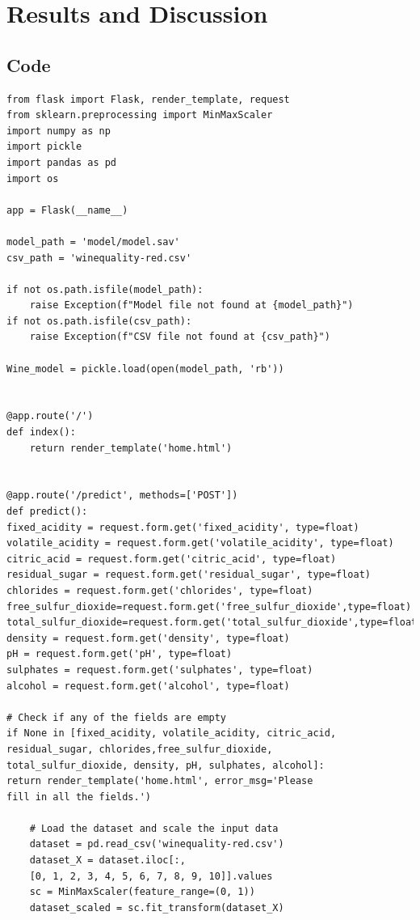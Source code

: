 \documentclass[a4paper, 12pt]{report}
\begin{document}
\chapter{Results and Discussion}
\section{Code}
\begin{lstlisting}
from flask import Flask, render_template, request
from sklearn.preprocessing import MinMaxScaler
import numpy as np
import pickle
import pandas as pd
import os

app = Flask(__name__)

model_path = 'model/model.sav'
csv_path = 'winequality-red.csv'

if not os.path.isfile(model_path):
    raise Exception(f"Model file not found at {model_path}")
if not os.path.isfile(csv_path):
    raise Exception(f"CSV file not found at {csv_path}")

Wine_model = pickle.load(open(model_path, 'rb'))


@app.route('/')
def index():
    return render_template('home.html')


@app.route('/predict', methods=['POST'])
def predict():
fixed_acidity = request.form.get('fixed_acidity', type=float)
volatile_acidity = request.form.get('volatile_acidity', type=float)
citric_acid = request.form.get('citric_acid', type=float)
residual_sugar = request.form.get('residual_sugar', type=float)
chlorides = request.form.get('chlorides', type=float)
free_sulfur_dioxide=request.form.get('free_sulfur_dioxide',type=float)
total_sulfur_dioxide=request.form.get('total_sulfur_dioxide',type=float)
density = request.form.get('density', type=float)
pH = request.form.get('pH', type=float)
sulphates = request.form.get('sulphates', type=float)
alcohol = request.form.get('alcohol', type=float)

# Check if any of the fields are empty
if None in [fixed_acidity, volatile_acidity, citric_acid, 
residual_sugar, chlorides,free_sulfur_dioxide, 
total_sulfur_dioxide, density, pH, sulphates, alcohol]:
return render_template('home.html', error_msg='Please 
fill in all the fields.')

    # Load the dataset and scale the input data
    dataset = pd.read_csv('winequality-red.csv')
    dataset_X = dataset.iloc[:, 
    [0, 1, 2, 3, 4, 5, 6, 7, 8, 9, 10]].values
    sc = MinMaxScaler(feature_range=(0, 1))
    dataset_scaled = sc.fit_transform(dataset_X)


\end{lstlisting}
\end{document}
